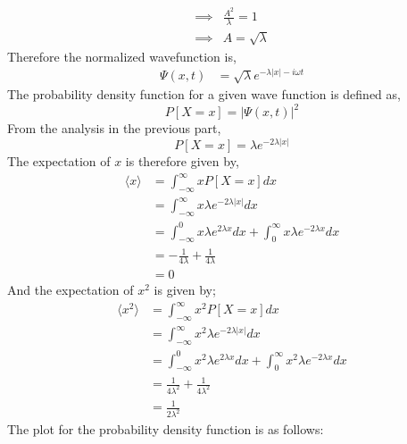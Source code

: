 \documentclass[addpoints]{exam}
\begin{document}
\begin{questions}
\begin{solution}
\begin{align*}
            \implies & \frac{A^2}{\lambda}                                                                                                   = 1              \\
            \implies & A                                                                                                                     = \sqrt{\lambda}
        \end{align*}
        Therefore the normalized wavefunction is,
        \begin{align*}
            \Psi(x,t) & = \sqrt{\lambda}e^{-\lambda |x|-i\omega t}
        \end{align*}
        The probability density function for a given wave function is defined as,
        \[P[X=x] = |\Psi(x,t)|^2\]
        From the analysis in the previous part,
        \[P[X=x] = \lambda e^{-2\lambda|x|}\]
        The expectation of $x$ is therefore given by,
        \begin{align*}
            \langle x \rangle & = \int_{-\infty}^{\infty} xP[X=x] dx                                                            \\
                              & = \int_{-\infty}^{\infty} x\lambda e^{-2\lambda|x|} dx                                          \\
                              & = \int_{-\infty}^{0} x\lambda e^{2\lambda x} dx + \int_{0}^{\infty} x\lambda e^{-2\lambda x} dx \\
                              & = -\frac{1}{4\lambda} + \frac{1}{4\lambda}                                                      \\
                              & = 0
        \end{align*}
        And the expectation of $x^2$ is given by;
        \begin{align*}
            \langle x^2 \rangle & = \int_{-\infty}^{\infty} x^2P[X=x] dx                                                              \\
                                & = \int_{-\infty}^{\infty} x^2\lambda e^{-2\lambda|x|} dx                                            \\
                                & = \int_{-\infty}^{0} x^2\lambda e^{2\lambda x} dx + \int_{0}^{\infty} x^2\lambda e^{-2\lambda x} dx \\
                                & = \frac{1}{4\lambda ^2} + \frac{1}{4\lambda ^2}                                                     \\
                                & = \frac{1}{2\lambda ^2}
        \end{align*}
        The plot for the probability density function is as follows:



\end{solution}
\end{questions}
\end{document}
